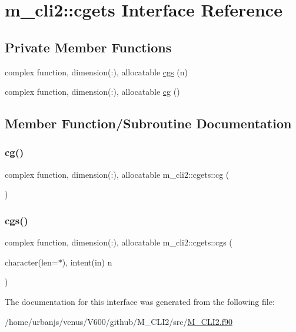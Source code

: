 \hypertarget{interfacem__cli2_1_1cgets}{}\section{m\+\_\+cli2\+:\+:cgets Interface Reference}
\label{interfacem__cli2_1_1cgets}
\subsection*{Private Member Functions}
\begin{DoxyCompactItemize}
\item 
complex function, dimension(\+:), allocatable \mbox{\hyperlink{interfacem__cli2_1_1cgets_a9fb39b8b17d37bc85b82e20b156ed052}{cgs}} (n)
\item 
complex function, dimension(\+:), allocatable \mbox{\hyperlink{interfacem__cli2_1_1cgets_aaad2a6212cfd75976791199058746e1b}{cg}} ()
\end{DoxyCompactItemize}


\subsection{Member Function/\+Subroutine Documentation}
\mbox{\label{interfacem__cli2_1_1cgets_aaad2a6212cfd75976791199058746e1b}} 
\subsubsection{\texorpdfstring{cg()}{cg()}}
{\footnotesize\ttfamily complex function, dimension(\+:), allocatable m\+\_\+cli2\+::cgets\+::cg (\begin{DoxyParamCaption}{ }\end{DoxyParamCaption})\hspace{0.3cm}{\ttfamily [private]}}

\mbox{\label{interfacem__cli2_1_1cgets_a9fb39b8b17d37bc85b82e20b156ed052}} 
\subsubsection{\texorpdfstring{cgs()}{cgs()}}
{\footnotesize\ttfamily complex function, dimension(\+:), allocatable m\+\_\+cli2\+::cgets\+::cgs (\begin{DoxyParamCaption}\item[{character(len=$\ast$), intent(in)}]{n }\end{DoxyParamCaption})\hspace{0.3cm}{\ttfamily [private]}}



The documentation for this interface was generated from the following file\+:\begin{DoxyCompactItemize}
\item 
/home/urbanjs/venus/\+V600/github/\+M\+\_\+\+C\+L\+I2/src/\mbox{\hyperlink{M__CLI2_8f90}{M\+\_\+\+C\+L\+I2.\+f90}}\end{DoxyCompactItemize}
